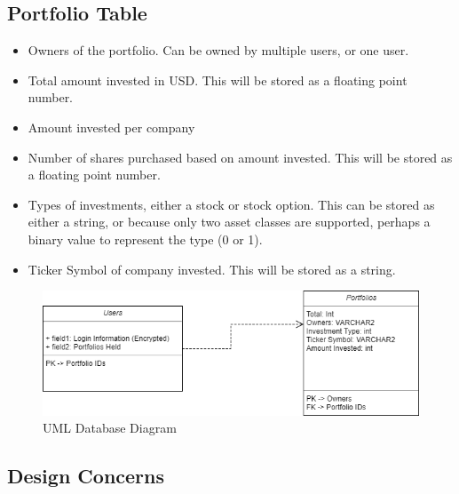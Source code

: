 \documentclass[onecolumn, draftclsnofoot,10pt, compsoc]{IEEEtran}
\begin{document}
\subsection{Portfolio Table}
\begin{itemize}
    \item Owners of the portfolio. Can be owned by multiple users, or one user.
    \item Total amount invested in USD. This will be stored as a floating point number.
    \item Amount invested per company
    \item Number of shares purchased based on amount invested. This will be stored as a floating point number.
    \item Types of investments, either a stock or stock option. This can be stored as either a string, or because only two asset classes are supported, perhaps a binary value to represent the type (0 or 1).
    \item Ticker Symbol of company invested. This will be stored as a string.

\end{itemize}

\begin{figure}[h]
\centering
\captionsetup{justification=centering}
\includegraphics[width=14cm]{database.png}
\caption{UML Database Diagram}
\end{figure}


\subsection{Design Concerns}
\end{document}
